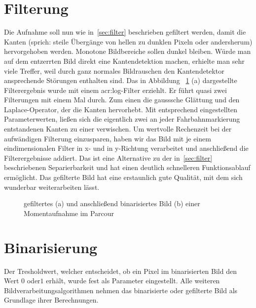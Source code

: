 \section{Filterung}
Die Aufnahme soll nun wie in~\ref{sec:filter} beschrieben gefiltert werden, damit die Kanten (sprich: steile Übergänge von hellen zu dunklen Pixeln oder andersherum) hervorgehoben werden. Monotone Bildbereiche sollen dunkel bleiben. Würde man auf dem entzerrten Bild direkt eine Kantendetektion machen, erhielte man sehr viele Treffer, weil durch ganz normales Bildrauschen den Kantendetektor ansprechende Störungen enthalten sind. Das in Abbildung ~\ref{fig:bildvorverarbeitung_filtern} (a) dargestellte Filterergebnis wurde mit einem \gls{acr:log}-Filter erziehlt. Er führt quasi zwei Filterungen mit einem Mal durch. Zum einen die gausssche Glättung und den Laplace-Operator, der die Kanten hervorhebt. Mit entsprechend eingestellten Parameterwerten, ließen sich die eigentlich zwei an jeder Fahrbahnmarkierung entstandenen Kanten zu einer verwischen. Um wertvolle Rechenzeit bei der aufwändigen Filterung einzusparen, haben wir das Bild mit je einem eindimensionalen Filter in x- und in y-Richtung verarbeitet und anschließend die Filterergebnisse addiert. Das ist eine Alternative zu der in~\ref{sec:filter} beschriebenen Separierbarkeit und hat einen deutlich schnelleren Funktionsablauf ermöglicht. Das gefilterte Bild hat eine erstaunlich gute Qualität, mit dem sich wunderbar weiterarbeiten lässt.


\begin{figure}[hb] %
  \centering
  \qquad
  \caption{gefiltertes (a) und anschließend binarisiertes Bild (b) einer Momentaufnahme im Parcour}
\label{fig:bildvorverarbeitung_filtern}
\end{figure} 

\section{Binarisierung}

Der Tresholdwert, welcher entscheidet, ob ein Pixel im binarisierten Bild den Wert \glqq \(0\)\grqq{} oder\glqq \(1\)\grqq{} erhält, wurde fest als Parameter eingestellt. Alle weiteren Bildverarbeitungsalgorithmen nehmen das binarisierte oder gefilterte Bild als Grundlage ihrer Berechnungen.